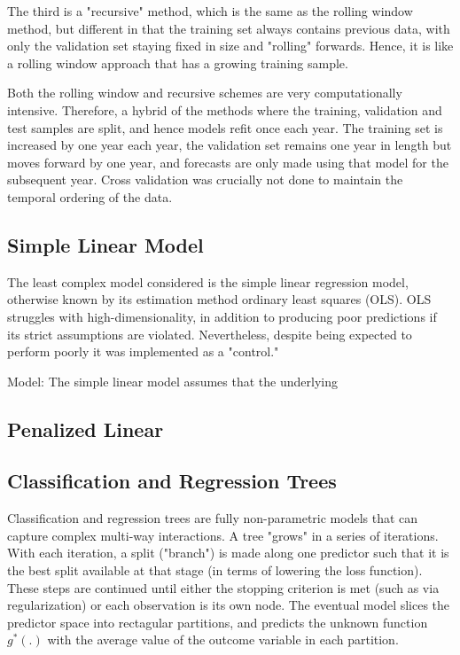 \documentclass[man, a4paper, biblatex]{apa6}
\begin{document}
The third is a "recursive" method, which is the same as the rolling window method, but different in that the training set always contains previous data, with only the validation set staying fixed in size and "rolling" forwards. Hence, it is like a rolling window approach that has a growing training sample.

Both the rolling window and recursive schemes are very computationally intensive. Therefore, a hybrid of the methods where the training, validation and test samples are split, and hence models refit once each year. The training set is increased by one year each year, the validation set remains one year in length but moves forward by one year, and forecasts are only made using that model for the subsequent year. Cross validation was crucially not done to maintain the temporal ordering of the data.

\subsection{Simple Linear Model}

The least complex model considered is the simple linear regression model, otherwise known by its estimation method ordinary least squares (OLS). OLS struggles with high-dimensionality, in addition to producing poor predictions if its strict assumptions are violated. Nevertheless, despite being expected to perform poorly it was implemented as a "control."

Model: The simple linear model assumes that the underlying 

\subsection{Penalized Linear}



\subsection{Classification and Regression Trees}

Classification and regression trees are fully non-parametric models that can capture complex multi-way interactions. A tree "grows" in a series of iterations. With each iteration, a split ("branch") is made along one predictor such that it is the best split available at that stage (in terms of lowering the loss function). These steps are continued until either the stopping criterion is met (such as via regularization) or each observation is its own node. The eventual model slices the predictor space into rectagular partitions, and predicts the unknown function $g^*(.)$ with the average value of the outcome variable in each partition.
\end{document}
